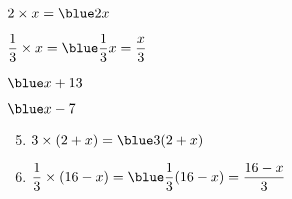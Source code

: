    \ \\ [-5mm]
   \begin{colenumerate}{2}
      \item $2\times x =\blue2x$ \smallskip
      \item $\dfrac13\times x =\blue\dfrac13x =\dfrac{x}{3}$ \smallskip
      \item $\blue x+13$
      \item $\blue x-7$
   \end{colenumerate}
   \begin{enumerate}
      \setcounter{enumi}{4}
      \item $3\times(2+x) =\blue3(2+x)$ \smallskip
      \item $\dfrac13\times(16-x) =\blue\dfrac13(16-x) =\dfrac{16-x}{3}$
   \end{enumerate}
